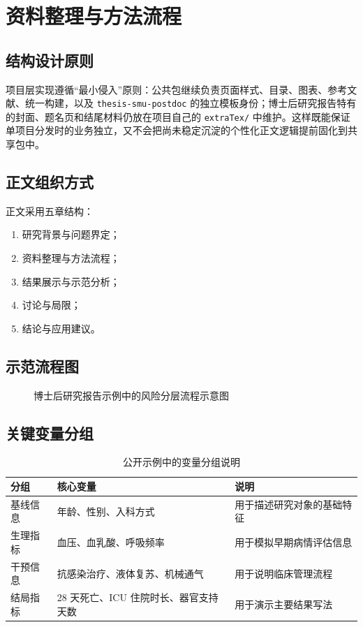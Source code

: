 \chapter{资料整理与方法流程}

\section{结构设计原则}

项目层实现遵循“最小侵入”原则：公共包继续负责页面样式、目录、图表、参考文献、统一构建，以及 \texttt{thesis-smu-postdoc} 的独立模板身份；博士后研究报告特有的封面、题名页和结尾材料仍放在项目自己的 \texttt{extraTex/} 中维护。这样既能保证单项目分发时的业务独立，又不会把尚未稳定沉淀的个性化正文逻辑提前固化到共享包中。

\section{正文组织方式}

正文采用五章结构：

\begin{enumerate}
  \item 研究背景与问题界定；
  \item 资料整理与方法流程；
  \item 结果展示与示范分析；
  \item 讨论与局限；
  \item 结论与应用建议。
\end{enumerate}

\section{示范流程图}

\begin{figure}[H]
  \centering
  \caption{博士后研究报告示例中的风险分层流程示意图}
  \label{fig:postdoc-workflow}
\end{figure}

\section{关键变量分组}

\begin{table}[H]
  \centering
  \caption{公开示例中的变量分组说明}
  \label{tab:variables}
  \begin{tabularx}{0.92\textwidth}{@{}lXX@{}}
    \toprule
    分组 & 核心变量 & 说明 \\
    \midrule
    基线信息 & 年龄、性别、入科方式 & 用于描述研究对象的基础特征 \\
    生理指标 & 血压、血乳酸、呼吸频率 & 用于模拟早期病情评估信息 \\
    干预信息 & 抗感染治疗、液体复苏、机械通气 & 用于说明临床管理流程 \\
    结局指标 & 28 天死亡、ICU 住院时长、器官支持天数 & 用于演示主要结果写法 \\
    \bottomrule
  \end{tabularx}
\end{table}
